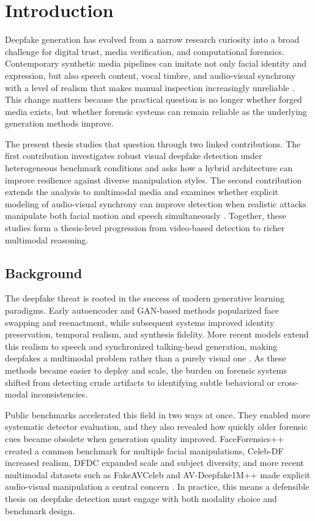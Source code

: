 \chapter{Introduction}
\label{chap:introduction}

Deepfake generation has evolved from a narrow research curiosity into a broad challenge for digital trust, media verification, and computational forensics. Contemporary synthetic media pipelines can imitate not only facial identity and expression, but also speech content, vocal timbre, and audio-visual synchrony with a level of realism that makes manual inspection increasingly unreliable \cite{kaur2024deepfake,mubarak2023survey,dissanayake2025review}. This change matters because the practical question is no longer whether forged media exists, but whether forensic systems can remain reliable as the underlying generation methods improve.

The present thesis studies that question through two linked contributions. The first contribution investigates robust visual deepfake detection under heterogeneous benchmark conditions and asks how a hybrid architecture can improve resilience against diverse manipulation styles. The second contribution extends the analysis to multimodal media and examines whether explicit modeling of audio-visual synchrony can improve detection when realistic attacks manipulate both facial motion and speech simultaneously \cite{Khalid2022,Jung2024,Yang2023}. Together, these studies form a thesis-level progression from video-based detection to richer multimodal reasoning.

\section{Background}

The deepfake threat is rooted in the success of modern generative learning paradigms. Early autoencoder and GAN-based methods popularized face swapping and reenactment, while subsequent systems improved identity preservation, temporal realism, and synthesis fidelity. More recent models extend this realism to speech and synchronized talking-head generation, making deepfakes a multimodal problem rather than a purely visual one \cite{kaur2024deepfake,gong2024survey,mubarak2023survey}. As these methods became easier to deploy and scale, the burden on forensic systems shifted from detecting crude artifacts to identifying subtle behavioral or cross-modal inconsistencies.

Public benchmarks accelerated this field in two ways at once. They enabled more systematic detector evaluation, and they also revealed how quickly older forensic cues became obsolete when generation quality improved. FaceForensics++ created a common benchmark for multiple facial manipulations, Celeb-DF increased realism, DFDC expanded scale and subject diversity, and more recent multimodal datasets such as FakeAVCeleb and AV-Deepfake1M++ made explicit audio-visual manipulation a central concern \cite{roessler2019faceforensicspp,li2020celebdf,dolhansky2020dfdc,Khalid2022,Jung2024}. In practice, this means a defensible thesis on deepfake detection must engage with both modality choice and benchmark design.

